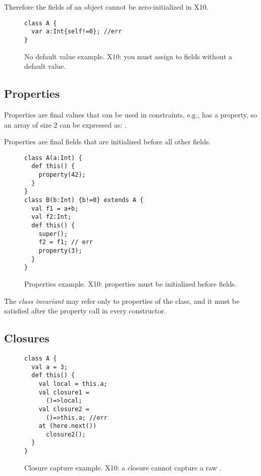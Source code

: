 Therefore the fields of an object cannot be zero-initialized in X10.

\begin{figure}
\begin{lstlisting}
class A {
  var a:Int{self!=0}; //err
}
\end{lstlisting}
\caption{No default value example.
    X10: you must assign to  fields without a default value.}
\label{Figure:Constraints}
\end{figure}


\subsection{Properties}
Properties are final values that can be used in constraints,
    e.g.,  has a  property,
    so an array of size 2 can be expressed as: .

Properties are final fields that are initialized before all other fields.


\begin{figure}
\begin{lstlisting}
class A(a:Int) {
  def this() {
    property(42);
  }
}
class B(b:Int) {b!=0} extends A {
  val f1 = a+b;
  val f2:Int;
  def this() {
    super();
    f2 = f1; // err
    property(3);
  }
}
\end{lstlisting}
\caption{Properties example.
    X10: properties must be initialized before fields.}
\label{Figure:Properties}
\end{figure}


The \emph{class invariant} may refer only to properties of the class,
    and it must be satisfied after the property call in every constructor.


\subsection{Closures}

\begin{figure}
\begin{lstlisting}
class A {
  val a = 3;
  def this() {
    val local = this.a;
    val closure1 =
      ()=>local;
    val closure2 =
      ()=>this.a; //err
    at (here.next())
      closure2();
  }
}
\end{lstlisting}
\caption{Closure capture \this example.
    X10: a closure cannot capture a raw \this.}
\label{Figure:Closures}
\end{figure}


